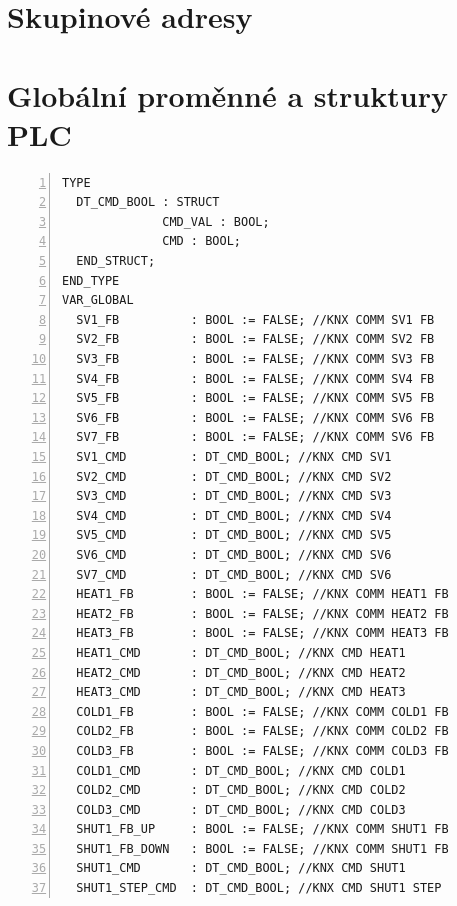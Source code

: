 \chapter{Skupinové adresy}
\label{apend:skupinove_adresy}




\chapter{Globální proměnné a struktury PLC}
\label{apend:globalni_promenne}
\begin{lstlisting}[language=ST, breaklines=true, numbers=left, numberstyle=\small, numbersep=10pt, frame=single, basicstyle=\ttfamily\small, caption={Globální proměnné a struktury PLC}, label={lst:globalni_promenne}]
TYPE
  DT_CMD_BOOL : STRUCT
              CMD_VAL : BOOL;
              CMD : BOOL;
  END_STRUCT;
END_TYPE
VAR_GLOBAL
  SV1_FB          : BOOL := FALSE; //KNX COMM SV1 FB
  SV2_FB          : BOOL := FALSE; //KNX COMM SV2 FB
  SV3_FB          : BOOL := FALSE; //KNX COMM SV3 FB
  SV4_FB          : BOOL := FALSE; //KNX COMM SV4 FB
  SV5_FB          : BOOL := FALSE; //KNX COMM SV5 FB
  SV6_FB          : BOOL := FALSE; //KNX COMM SV6 FB
  SV7_FB          : BOOL := FALSE; //KNX COMM SV6 FB
  SV1_CMD         : DT_CMD_BOOL; //KNX CMD SV1
  SV2_CMD         : DT_CMD_BOOL; //KNX CMD SV2
  SV3_CMD         : DT_CMD_BOOL; //KNX CMD SV3
  SV4_CMD         : DT_CMD_BOOL; //KNX CMD SV4
  SV5_CMD         : DT_CMD_BOOL; //KNX CMD SV5
  SV6_CMD         : DT_CMD_BOOL; //KNX CMD SV6
  SV7_CMD         : DT_CMD_BOOL; //KNX CMD SV6
  HEAT1_FB        : BOOL := FALSE; //KNX COMM HEAT1 FB
  HEAT2_FB        : BOOL := FALSE; //KNX COMM HEAT2 FB
  HEAT3_FB        : BOOL := FALSE; //KNX COMM HEAT3 FB
  HEAT1_CMD       : DT_CMD_BOOL; //KNX CMD HEAT1
  HEAT2_CMD       : DT_CMD_BOOL; //KNX CMD HEAT2
  HEAT3_CMD       : DT_CMD_BOOL; //KNX CMD HEAT3
  COLD1_FB        : BOOL := FALSE; //KNX COMM COLD1 FB
  COLD2_FB        : BOOL := FALSE; //KNX COMM COLD2 FB
  COLD3_FB        : BOOL := FALSE; //KNX COMM COLD3 FB
  COLD1_CMD       : DT_CMD_BOOL; //KNX CMD COLD1
  COLD2_CMD       : DT_CMD_BOOL; //KNX CMD COLD2
  COLD3_CMD       : DT_CMD_BOOL; //KNX CMD COLD3
  SHUT1_FB_UP     : BOOL := FALSE; //KNX COMM SHUT1 FB
  SHUT1_FB_DOWN   : BOOL := FALSE; //KNX COMM SHUT1 FB
  SHUT1_CMD       : DT_CMD_BOOL; //KNX CMD SHUT1
  SHUT1_STEP_CMD  : DT_CMD_BOOL; //KNX CMD SHUT1 STEP
\end{lstlisting}

